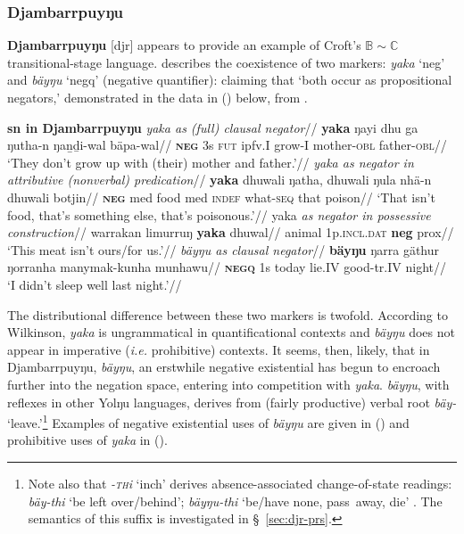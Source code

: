 {\subsubsection{Djambarrpuyŋu}\label{sec:nec-djr} \textbf{Djambarrpuyŋu} [\gls{djr}] appears to provide an example of Croft's $\mathbb{B\sim C}$ transitional-stage language. \citet[356]{Wilkinson1991} describes the coexistence of two markers: \textit{yaka} `\gls{neg}' and \textit{bäyŋu} `\gls{negq}' (negative quantifier): claiming that `both occur as propositional negators,' demonstrated in the data in (\nextx) below, from \citet{Wilkinson1991}.

\pex\textbf{\Acrlong{sn} in Djambarrpuyŋu}
\a\begingl\glpreamble \textit{{\em yaka} as (full) clausal negator}//
\gla \textbf{yaka} ŋayi dhu ga ŋutha-n ŋaṉḏi-wal bäpa-wal//
\glb \textsc{\textbf{neg}} 3\gls{s} \textsc{fut} \gls{ipfv}.\gls{I} grow-\textsc{I} mother\textsc{-obl} father\textsc{-obl}//
\glft `They don't grow up with (their) mother and father.'//
\endgl
\a\begingl\glpreamble \textit{{\em yaka} as negator in attributive (nonverbal) predication}//
\gla \textbf{yaka} dhuwali ŋatha, dhuwali ŋula nhä-n dhuwali botjin//
\glb \textsc{\textbf{neg}} \gls{med} food \gls{med} \textsc{indef} what-\textsc{seq} that poison//
\glft`That isn't food, that's something else, that's poisonous.'//\endgl
\a\begingl\glpreamble yaka \textit{as negator in possessive construction}//
\gla warrakan limurruŋ \textbf{yaka} dhuwal//
\glb animal 1\gls{p}.\textsc{incl.dat} \textbf{\gls{neg}} \gls{prox}//
\glft`This meat isn't ours/for us.'\trailingcitation{[AW~20190505]}//
\endgl
\a\begingl
\glpreamble\textit{ {\em bäyŋu} as clausal negator}//
\gla \textbf{bäyŋu} ŋarra gäthur ŋorranha manymak-kunha munhawu//
\glb \textsc{\textbf{negq}} 1\gls{s} today lie.\gls{IV} good-\gls{tr}.\gls{IV} night//
\glft `I didn't sleep well last night.'\hfill\citep[357]{Wilkinson1991}//
\endgl{}\xe

The distributional difference between these two markers is twofold. According to Wilkinson, \textit{yaka} is ungrammatical in quantificational contexts and \textit{bäyŋu} does not appear in imperative (\textit{i.e.} prohibitive) contexts. It seems, then, likely, that in Djambarrpuyŋu, \textit{bäyŋu}, an erstwhile negative existential has begun to encroach further into the negation space, entering into competition with \textit{yaka}. \textit{bäyŋu}, with reflexes in other Yolŋu languages, derives from (fairly productive) verbal root \textit{bäy-} `leave.'\footnote{Note also that \textit{-\textsc{th}i} `\gls{inch}' derives absence-associated change-of-state readings: \textit{bäy-thi} `be left over/behind'; \textit{bäyŋu-thi} `be/have none, pass~away, die' \citep[378]{Wilkinson1991}. The semantics of this suffix is investigated in \S~\ref{sec:djr-prs}.} Examples of negative existential uses of \textit{bäyŋu} are given in (\nextx) and prohibitive uses of \textit{yaka} in (\anextx).


}

